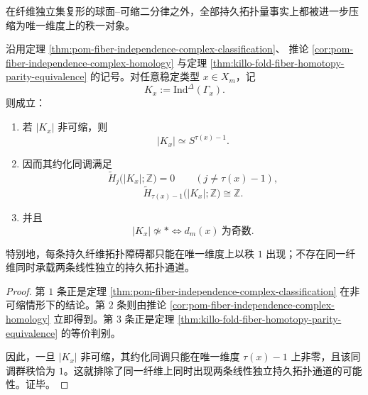 在纤维独立集复形的球面--可缩二分律之外，全部持久拓扑量事实上都被进一步压缩为唯一维度上的秩一对象。

\begin{theorem}[纤维拓扑的秩一律]\label{thm:xi-time-part10-fiber-topology-rankone-law}
沿用定理 \ref{thm:pom-fiber-independence-complex-classification}、
推论 \ref{cor:pom-fiber-independence-complex-homology} 与定理
\ref{thm:killo-fold-fiber-homotopy-parity-equivalence} 的记号。对任意稳定类型 \(x\in X_m\)，记
\[
K_x:=\mathrm{Ind}^{\Delta}(\Gamma_x).
\]
则成立：
\begin{enumerate}
  \item 若 \(|K_x|\) 非可缩，则
  \[
  |K_x|\simeq S^{\tau(x)-1}.
  \]
  \item 因而其约化同调满足
  \[
  \widetilde H_j\bigl(|K_x|;\mathbb Z\bigr)=0
  \qquad (j\neq \tau(x)-1),
  \]
  \[
  \widetilde H_{\tau(x)-1}\bigl(|K_x|;\mathbb Z\bigr)\cong \mathbb Z.
  \]
  \item 并且
  \[
  |K_x|\not\simeq *
  \iff
  d_m(x)\ \text{为奇数}.
  \]
\end{enumerate}
特别地，每条持久纤维拓扑障碍都只能在唯一维度上以秩 \(1\) 出现；不存在同一纤维同时承载两条线性独立的持久拓扑通道。
\end{theorem}
\begin{proof}
第 \(1\) 条正是定理 \ref{thm:pom-fiber-independence-complex-classification}
在非可缩情形下的结论。第 \(2\) 条则由推论
\ref{cor:pom-fiber-independence-complex-homology} 立即得到。第 \(3\) 条正是定理
\ref{thm:killo-fold-fiber-homotopy-parity-equivalence} 的等价判别。

因此，一旦 \(|K_x|\) 非可缩，其约化同调只能在唯一维度
\(\tau(x)-1\) 上非零，且该同调群秩恰为 \(1\)。这就排除了同一纤维上同时出现两条线性独立持久拓扑通道的可能性。证毕。
\end{proof}

\endinput
